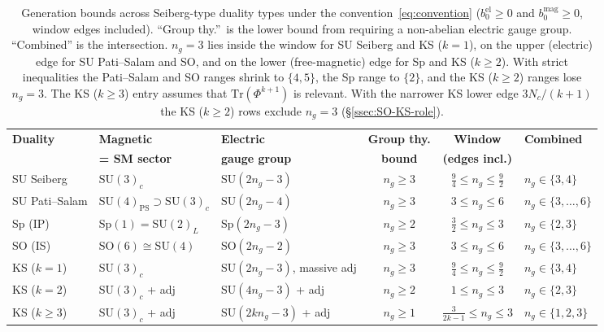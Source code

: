 \documentclass[11pt,a4paper]{article}
\theoremstyle{plain}
\theoremstyle{definition}
\theoremstyle{remark}
\newcommand{\Nc}{N_{\!c}}
\newcommand{\ngen}{n_g}
\newcommand{\SU}[1]{\mathrm{SU}(#1)}
\newcommand{\SO}[1]{\mathrm{SO}(#1)}
\newcommand{\Sp}[1]{\mathrm{Sp}(#1)}
\newcommand{\Tr}{\mathrm{Tr}}
\begin{document}
\begin{table}[h!]
\centering
\footnotesize
\setlength{\tabcolsep}{4pt}
\renewcommand{\arraystretch}{1.6}
\begin{tabular}{@{}l l l c c l@{}}
\toprule
\textbf{Duality} & \textbf{Magnetic} & \textbf{Electric} &
  \textbf{Group thy.} & \textbf{Window} &
  \textbf{Combined} \\
& \textbf{= SM sector} & \textbf{gauge group} &
  \textbf{bound} & \textbf{(edges incl.)} & \\
\midrule
SU Seiberg & $\SU{3}_c$ & $\SU{2\ngen - 3}$ &
  $\ngen \geq 3$ & $\frac{9}{4} \leq \ngen \leq \frac{9}{2}$ &
  $\ngen \in \{3,4\}$ \\
SU Pati--Salam & $\SU{4}_{\mathrm{PS}} \supset \SU{3}_c$ &
  $\SU{2\ngen - 4}$ &
  $\ngen \geq 3$ & $3 \leq \ngen \leq 6$ & $\ngen \in \{3,\ldots,6\}$ \\
$\mathrm{Sp}$ (IP) & $\Sp{1} = \SU{2}_L$ & $\Sp{2\ngen - 3}$ &
  $\ngen \geq 2$ & $\frac{3}{2} \leq \ngen \leq 3$ &
  $\ngen \in \{2,3\}$ \\
$\mathrm{SO}$ (IS) & $\SO{6} \cong \SU{4}$ & $\SO{2\ngen - 2}$ &
  $\ngen \geq 3$ & $3 \leq \ngen \leq 6$ & $\ngen \in \{3,\ldots,6\}$ \\
KS ($k=1$) & $\SU{3}_c$ & $\SU{2\ngen - 3}$, massive adj &
  $\ngen \geq 3$ & $\frac{9}{4} \leq \ngen \leq \frac{9}{2}$ &
  $\ngen \in \{3,4\}$ \\
KS ($k=2$) & $\SU{3}_c$ + adj & $\SU{4\ngen - 3}$ + adj &
  $\ngen \geq 2$ & $1 \leq \ngen \leq 3$ & $\ngen \in \{2,3\}$ \\
KS ($k \geq 3$) & $\SU{3}_c$ + adj & $\SU{2k\ngen - 3}$ + adj &
  $\ngen \geq 1$ & $\frac{3}{2k-1} \leq \ngen \leq 3$ &
  $\ngen \in \{1,2,3\}$ \\
\bottomrule
\end{tabular}
\caption{Generation bounds across Seiberg-type duality types under the
convention~\eqref{eq:convention} ($b_0^{\mathrm{el}} \geq 0$ and
$b_0^{\mathrm{mag}} \geq 0$, window edges included).  ``Group thy.''\ is
the lower bound from requiring a non-abelian electric gauge group.
``Combined'' is the intersection.  $\ngen = 3$ lies inside the window for
SU Seiberg and KS ($k=1$), on the upper (electric) edge for SU
Pati--Salam and SO, and on the lower (free-magnetic) edge for Sp and KS
($k \geq 2$).  With strict inequalities the Pati--Salam and SO ranges
shrink to $\{4,5\}$, the Sp range to $\{2\}$, and the KS ($k \geq 2$)
ranges lose $\ngen = 3$.  The KS ($k \geq 3$) entry assumes that
$\Tr(\Phi^{k+1})$ is relevant.  With the narrower KS lower edge
$3\Nc/(k+1)$ the KS ($k \geq 2$) rows exclude $\ngen = 3$
(\S\ref{ssec:SO-KS-role}).}
\label{tab:master}
\end{table}
\end{document}
